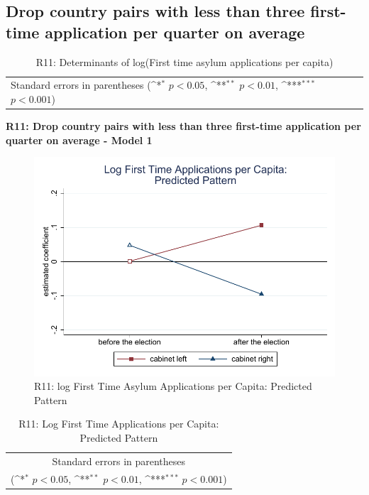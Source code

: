 \documentclass[10pt,a4paper]{scrartcl}
\begin{document}


\clearpage
\FloatBarrier
\subsection{Drop country pairs with less than three first-time application per quarter on average}
\begin{table}[!ht]\centering
	\renewcommand{\arraystretch}{1.25}
	\small
	\def\sym#1{\ifmmode^{#1}\else\(^{#1}\)\fi}
	\caption{R11: Determinants of log(First time asylum applications per capita)}
	\begin{tabular}{l*{3}{c}}
		\hline\hline
		
		\hline\hline
		\multicolumn{4}{l}{\footnotesize Standard errors in parentheses (\sym{*} \(p<0.05\), \sym{**} \(p<0.01\), \sym{***} \(p<0.001\))}\\
	\end{tabular}
\end{table}

\clearpage
\textbf{R11: Drop country pairs with less than three first-time application per quarter on average - Model 1}
\begin{figure}[!ht]
	\centering
	\includegraphics[width=1\textwidth]{figures_edited/app_graph1_R11.pdf}
	\caption{R11: log First Time Asylum Applications per Capita: Predicted Pattern}
\end{figure}

\begin{table}[!ht]\centering
	\renewcommand{\arraystretch}{1.25}
	\def\sym#1{\ifmmode^{#1}\else\(^{#1}\)\fi}
	\caption{R11: Log First Time Applications per Capita: Predicted Pattern}
	\begin{tabular}{l*{2}{c}}
		\hline\hline
		
		\hline\hline
		\multicolumn{3}{c}{\footnotesize Standard errors in parentheses} \\
		\multicolumn{3}{c}{\footnotesize (\sym{*} \(p<0.05\), \sym{**} \(p<0.01\), \sym{***} \(p<0.001\))}\\
	\end{tabular}
\end{table}
\end{document}
